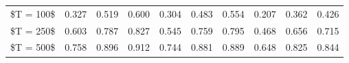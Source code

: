 % 
\begin{tabular}{cccccccccc}
  \hline
  \hline
\$T = 100\$ & 0.327 & 0.519 & 0.600 & 0.304 & 0.483 & 0.554 & 0.207 & 0.362 & 0.426 \\ 
  \$T = 250\$ & 0.603 & 0.787 & 0.827 & 0.545 & 0.759 & 0.795 & 0.468 & 0.656 & 0.715 \\ 
  \$T = 500\$ & 0.758 & 0.896 & 0.912 & 0.744 & 0.881 & 0.889 & 0.648 & 0.825 & 0.844 \\ 
   \hline
\end{tabular}
